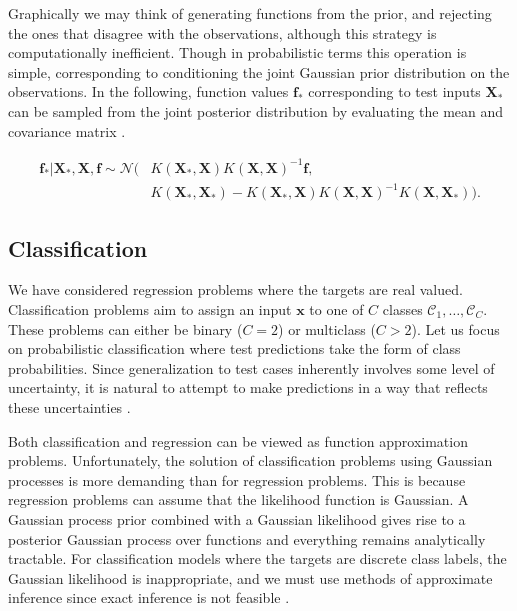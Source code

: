 \documentclass[../../../main.tex]{subfiles}
\begin{document}
Graphically we may think of generating functions from the prior, and rejecting the ones that disagree with the observations, although this strategy is computationally inefficient. Though in probabilistic terms this operation is simple, corresponding to conditioning the joint Gaussian prior distribution on the observations. In the following, function values $\bm{f}_\ast$ corresponding to test inputs $\bm{X}_\ast$ can be sampled from the joint posterior distribution by evaluating the mean and covariance matrix \autocite{Rasmussen2005}.

\begin{equation}
\begin{split}
\bm{f}_\ast|\bm{X}_\ast,\bm{X},\bm{f}
\sim\mathcal{N}(&K(\bm{X}_\ast,\bm{X})K(\bm{X},\bm{X})^{-1}\bm{f},\\
&K(\bm{X}_\ast,\bm{X}_\ast)-K(\bm{X}_\ast,\bm{X})K(\bm{X},\bm{X})^{-1}K(\bm{X},\bm{X}_\ast)).
\end{split}
\end{equation}

\subsection{Classification}

We have considered regression problems where the targets are real valued. Classification problems aim to assign an input $\bm{x}$ to one of $C$ classes $\mathcal{C}_1,\ldots,\mathcal{C}_C$. These problems can either be binary ($C=2$) or multiclass ($C>2$). Let us focus on probabilistic classification where test predictions take the form of class probabilities. Since generalization to test cases inherently involves some level of uncertainty, it is natural to attempt to make predictions in a way that reflects these uncertainties \autocite{Rasmussen2005}.

Both classification and regression can be viewed as function approximation problems. Unfortunately, the solution of classification problems using Gaussian processes is more demanding than for regression problems. This is because regression problems can assume that the likelihood function is Gaussian. A Gaussian process prior combined with a Gaussian likelihood gives rise to a posterior Gaussian process over functions and everything remains analytically tractable. For classification models where the targets are discrete class labels, the Gaussian likelihood is inappropriate, and we must use methods of approximate inference since exact inference is not feasible \autocite{Rasmussen2005}.
\end{document}

